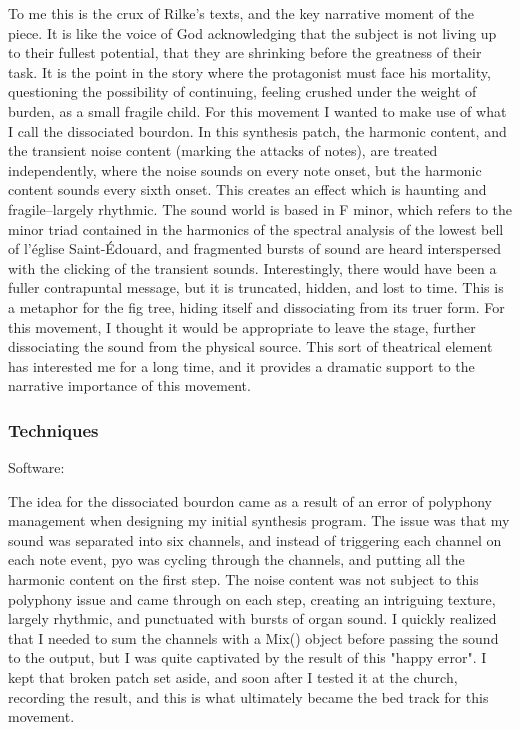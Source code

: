 \documentclass[12pt,twoside,maitrise]{dms}
\theoremstyle{definition}
\begin{document}
To me this is the crux of Rilke's texts, and the key narrative moment of the piece.
It is like the voice of God acknowledging that the subject is not living up to their fullest potential, that they are shrinking before the greatness of their task.
It is the point in the story where the protagonist must face his mortality, questioning the possibility of continuing, feeling crushed under the weight of burden, as a small fragile child.
For this movement I wanted to make use of what I call the dissociated bourdon.
In this synthesis patch, the harmonic content, and the transient noise content (marking the attacks of notes), are treated independently, where the noise sounds on every note onset, but the harmonic content sounds every sixth onset.
This creates an effect which is haunting and fragile--largely rhythmic.
The sound world is based in F minor, which refers to the minor triad contained in the harmonics of the spectral analysis of the lowest bell of l'église Saint-Édouard, and fragmented bursts of sound are heard interspersed with the clicking of the transient sounds.
Interestingly, there would have been a fuller contrapuntal message, but it is truncated, hidden, and lost to time.
This is a metaphor for the fig tree, hiding itself and dissociating from its truer form.
For this movement, I thought it would be appropriate to leave the stage, further dissociating the sound from the physical source.
This sort of theatrical element has interested me for a long time, and it provides a dramatic support to the narrative importance of this movement.

\subsubsection{Techniques}

Software:

The idea for the dissociated bourdon came as a result of an error of polyphony management when designing my initial synthesis program.
The issue was that my sound was separated into six channels, and instead of triggering each channel on each note event, pyo was cycling through the channels, and putting all the harmonic content on the first step.
The noise content was not subject to this polyphony issue and came through on each step, creating an intriguing texture, largely rhythmic, and punctuated with bursts of organ sound.
I quickly realized that I needed to sum the channels with a Mix() object before passing the sound to the output, but I was quite captivated by the result of this "happy error".
I kept that broken patch set aside, and soon after I tested it at the church, recording the result, and this is what ultimately became the bed track for this movement.
\end{document}
